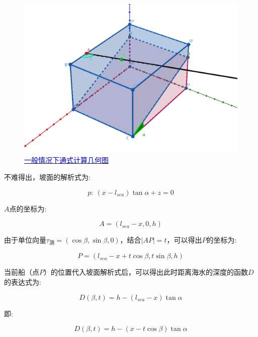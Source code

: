 \begin{figure}[h]
    \centering
    \includegraphics[scale=0.3]{res/img/一般情况下通式计算几何图.png}
    \caption{\href{https://www.geogebra.org/m/jzwhwcqr}{\textcolor{blue}{一般情况下通式计算几何图}}}
    \label{fig:一般情况下通式计算几何图}
\end{figure}

不难得出，坡面的解析式为:

\begin{equation}
    p: \ 
    (x - l_{sea})\tan \alpha + z = 0
\end{equation}

$A$点的坐标为:

\begin{equation}
    A = (l_{sea} - x, 0, h)
\end{equation}

由于单位向量$\tau_\text{测} = (\cos \beta, \sin \beta, 0)$，结合$|AP| = t$，可以得出$P$的坐标为:

\begin{equation}
    P = (l_{sea} - x + t\cos \beta, 
        t\sin \beta, 
        h)
\end{equation}

当前船（点$P$）的位置代入坡面解析式后，可以得出此时距离海水的深度的函数$D$的表达式为:

\begin{equation*}
    D(\beta, t) = 
    h - \left(l_{sea} - x\right)\tan \alpha
\end{equation*}

即:

\begin{equation}
    D(\beta, t) = 
    h - \left(x - t\cos \beta \right)\tan \alpha
\end{equation}

